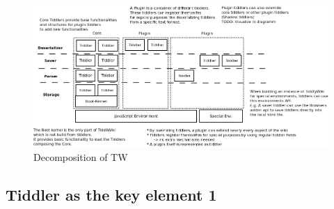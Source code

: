\documentclass[12pt,a4paper]{article}
\newcommand{\todo}[1]{{\bf TODO: #1}\\
}
\begin{document}
\begin{figure}[hbtp]
\includegraphics[scale=0.4]{images/overview.png}
\caption{Decomposition of TW}
\end{figure}
\newpage
\subsection{Tiddler as the key element 1}
\end{document}

